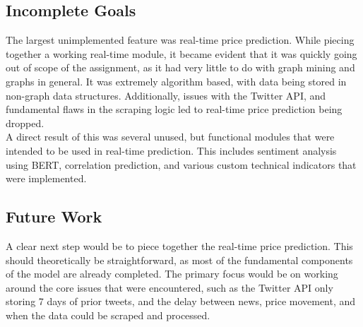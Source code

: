 \documentclass[11pt]{article}
\newcommand{\np}{\newpage}
\begin{document}
\subsection{Incomplete Goals}
The largest unimplemented feature was real-time price prediction.  While piecing together a working real-time module, it became evident that it was quickly going out of scope of the assignment, as it had very little to do with graph mining and graphs in general.  It was extremely algorithm based, with data being stored in non-graph data structures.  Additionally, issues with the Twitter API, and fundamental 
flaws in the scraping logic led to real-time price prediction being dropped.\\[2mm]
A direct result of this was several unused, but functional modules that were intended to be used in real-time prediction.  This includes sentiment analysis using BERT, correlation prediction, and various custom technical indicators that were implemented.

\subsection{Future Work}
A clear next step would be to piece together the real-time price prediction.  This should theoretically be straightforward, as most of the fundamental components of the model are already completed.  The primary focus would be on working around the core issues that were encountered, such as the Twitter API only storing 7 days of prior tweets, and the delay between news, price movement, and when the data could be scraped and processed.

\np
\end{document}

